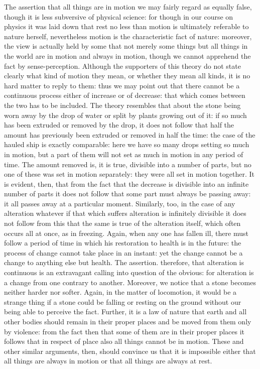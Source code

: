 The assertion that all things are in motion we may fairly regard as
equally false, though it is less subversive of physical science: for
though in our course on physics it was laid down that rest no less
than motion is ultimately referable to nature herself, nevertheless
motion is the characteristic fact of nature: moreover, the view is
actually held by some that not merely some things but all things in
the world are in motion and always in motion, though we cannot apprehend
the fact by sense-perception. Although the supporters of this theory
do not state clearly what kind of motion they mean, or whether they
mean all kinds, it is no hard matter to reply to them: thus we may
point out that there cannot be a continuous process either of increase
or of decrease: that which comes between the two has to be included.
The theory resembles that about the stone being worn away by the drop
of water or split by plants growing out of it: if so much has been
extruded or removed by the drop, it does not follow that half the
amount has previously been extruded or removed in half the time: the
case of the hauled ship is exactly comparable: here we have so many
drops setting so much in motion, but a part of them will not set as
much in motion in any period of time. The amount removed is, it is
true, divisible into a number of parts, but no one of these was set
in motion separately: they were all set in motion together. It is
evident, then, that from the fact that the decrease is divisible into
an infinite number of parts it does not follow that some part must
always be passing away: it all passes away at a particular moment.
Similarly, too, in the case of any alteration whatever if that which
suffers alteration is infinitely divisible it does not follow from
this that the same is true of the alteration itself, which often occurs
all at once, as in freezing. Again, when any one has fallen ill, there
must follow a period of time in which his restoration to health is
in the future: the process of change cannot take place in an instant:
yet the change cannot be a change to anything else but health. The
assertion. therefore, that alteration is continuous is an extravagant
calling into question of the obvious: for alteration is a change from
one contrary to another. Moreover, we notice that a stone becomes
neither harder nor softer. Again, in the matter of locomotion, it
would be a strange thing if a stone could be falling or resting on
the ground without our being able to perceive the fact. Further, it
is a law of nature that earth and all other bodies should remain in
their proper places and be moved from them only by violence: from
the fact then that some of them are in their proper places it follows
that in respect of place also all things cannot be in motion. These
and other similar arguments, then, should convince us that it is impossible
either that all things are always in motion or that all things are
always at rest. 

